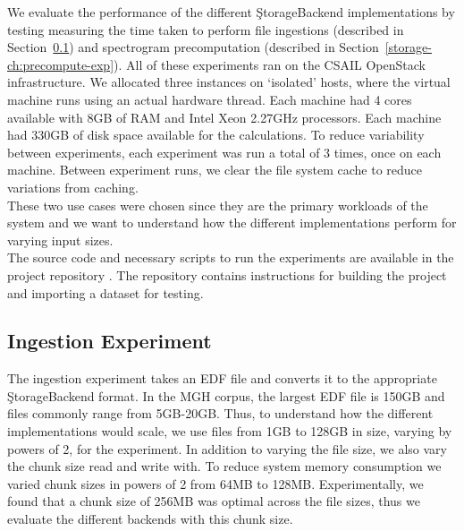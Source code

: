 We evaluate the performance of the different \c{StorageBackend} implementations
by testing measuring the time taken to perform file ingestions (described in
Section~\ref{storage-ch:ingestion-exp}) and spectrogram precomputation
(described in Section~\ref{storage-ch:precompute-exp}). All of these
experiments ran on the CSAIL OpenStack infrastructure. We allocated three
instances on `isolated' hosts, where the virtual machine runs using an actual
hardware thread. Each machine had 4 cores available with 8GB of RAM and Intel
Xeon 2.27GHz processors. Each machine had 330GB of disk space available
for the calculations. To reduce variability between experiments, each
experiment was run a total of 3 times, once on each machine. Between experiment
runs, we clear the file system cache to reduce variations from caching. \\

These two use cases were chosen since they are the primary workloads of the
system and we want to understand how the different implementations perform for
varying input sizes.\\

The source code and necessary scripts to run the experiments are available
in the project repository \cite{eeg-toolkit}. The repository contains
instructions for building the project and importing a dataset for testing.

\subsection{Ingestion Experiment}\label{storage-ch:ingestion-exp}

The ingestion experiment takes an EDF file and converts it to the appropriate
\c{StorageBackend} format. In the MGH corpus, the largest EDF file is 150GB and
files commonly range from 5GB-20GB. Thus, to understand how the different
implementations would scale, we use files from 1GB to 128GB in size, varying by
powers of 2, for the experiment. In addition to varying the file size, we also
vary the chunk size read and write with. To reduce system memory consumption we
varied chunk sizes in powers of 2 from 64MB to 128MB. Experimentally, we found
that a chunk size of 256MB was optimal across the file sizes, thus we evaluate
the different backends with this chunk size.

